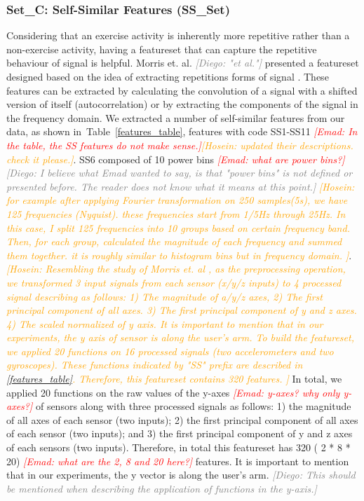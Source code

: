 \documentclass[journal,article,submit,moreauthors,pdftex]{Definitions/mdpi}
\newcommand{\emad}[1]{\textcolor{red}{{\it [Emad: #1]}}}
\newcommand{\hosein}[1]{\textcolor{orange}{{\it [Hosein: #1]}}}
\newcommand{\diego}[1]{\textcolor{gray}{{\it [Diego: #1]}}}
\begin{document}
\subsubsection{Set\_C: Self-Similar Features (SS\_Set)}
Considering that an exercise activity is inherently more repetitive rather than a non-exercise activity, having a featureset that can capture the repetitive behaviour of signal is helpful. Morris et. al. \diego{"et al."} presented a featureset designed based on the idea of extracting repetitions forms of signal \cite{morris2014recofit}. These features can be extracted by calculating the convolution of a signal with a shifted version of itself (autocorrelation) or by extracting the components of the signal in the frequency domain. We extracted a number of self-similar features from our data, as shown in~Table~\ref{features_table}, features with code SS1-SS11 \emad{In the table, the SS features do not make sense.}\hosein{updated their descriptions. check it please.}. SS6 composed of 10 power bins \emad{what are power bins?} \diego{I believe what Emad wanted to say, is that "power bins" is not defined or presented before. The reader does not know what it means at this point.} \hosein{for example after applying Fourier transformation on 250 samples(5s), we have 125 frequencies (Nyquist). these frequencies start from 1/5Hz through 25Hz. In this case, I split 125 frequencies into 10 groups based on certain frequency band. Then, for each group, calculated the magnitude of each frequency and summed them together. it is roughly similar to histogram bins but in frequency domain. }.
\hosein{Resembling the study of Morris et. al \cite{morris2014recofit}, as the preprocessing operation, we transformed 3 input signals from each sensor (x/y/z inputs) to 4 processed signal describing as follows: 1) The magnitude of a/y/z axes, 2) The first principal component of all axes. 3) The first principal component of y and z axes. 4) The scaled normalized of y axis. It is important to mention that in our experiments, the y axis of sensor is along the user's arm. To build the featureset, we applied 20 functions on 16 processed signals (two accelerometers and two gyroscopes). These functions indicated by "SS" prefix are described in \ref{features_table}. Therefore, this featureset contains 320 features. }
In total, we applied 20 functions on the raw values of the y-axes \emad{y-axes? why only y-axes?} of sensors along with three processed signals as follows: 1) the magnitude of all axes of each sensor (two inputs); 2) the first principal component of all axes of each sensor (two inputs); and 3) the first principal component of y and z axes of each sensors (two inputs). Therefore, in total this featureset has 320 ( 2 * 8 * 20) \emad{what are the 2, 8 and 20 here?} features. It is important to mention that in our experiments, the y vector is along the user's arm. \diego{This should be mentioned when describing the application of functions in the y-axis.}
\end{document}
